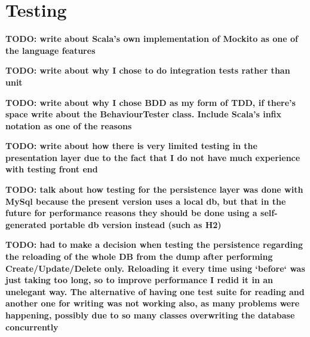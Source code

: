 \section{Testing} \label{sec:Testing}

\textbf{TODO: write about Scala's own implementation of Mockito as one of the
language features}

\textbf{TODO: write about why I chose to do integration tests rather than unit}

\textbf{TODO: write about why I chose BDD as my form of TDD, if there's space
write about the BehaviourTester class. Include Scala's infix notation as one of
the reasons}

\textbf{TODO: write about how there is very limited testing in the presentation
layer due to the fact that I do not have much experience with testing front
end}

\textbf{TODO: talk about how testing for the persistence layer was done with
MySql because the present version uses a local db, but that in the future for
performance reasons they should be done using a self-generated portable db
version instead (such as H2)}

\textbf{TODO: had to make a decision when testing the persistence regarding the
reloading of the whole DB from the dump after performing Create/Update/Delete only.
Reloading it every time using `before` was just taking too long, so to improve
performance I redid it in an unelegant way. The alternative of having one test suite for 
reading and another one for writing was not working also, as many problems were happening,
possibly due to so many classes overwriting the database concurrently}
